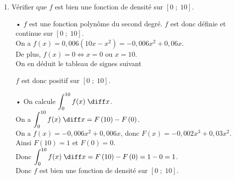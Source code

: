 \begin{itemize}
\item[1.] Vérifier que $f$ est bien une fonction de densité sur $\left[0 \; ; \; 10\right]$. \\ 

\begin{itemize}
\item[•] $f$ est une fonction polynôme du second degré. $f$ est donc définie et continue sur $\left[0 \; ; \; 10\right]$. \\

On a $f(x) = 0,006\left(10x-x^2\right) = -0,006x^2 + 0,06x$. \\

De plus, $f(x) = 0 \Longleftrightarrow x = 0$ ou $x = 10$. \\

On en déduit le tableau de signes suivant \\


\vspace*{.3cm}

$f$ est donc positif sur $\left[0 \; ; \; 10\right]$. \\

\item[•] On calcule $\displaystyle{\int_0^{10} f(x) \; \diff x}$. \\

On a $\displaystyle{\int_0^{10} f(x) \; \diff x} = F\left(10\right) - F\left(0\right)$. \\

On a $f(x) = -0,006x^2 + 0,006x$, donc $F(x) = -0,002x^3 + 0,03x^2$. \\

Ainsi $F(10) = 1$ et $F(0) = 0$. \\

Donc $\displaystyle{\int_0^{10} f(x) \; \diff x} = F\left(10\right) - F\left(0\right) = 1 - 0 = 1$. \\

Donc $f$ est bien une fonction de densité sur $\left[0 \; ; \; 10\right]$.
\end{itemize}

\vspace*{.3cm}


\end{itemize}
